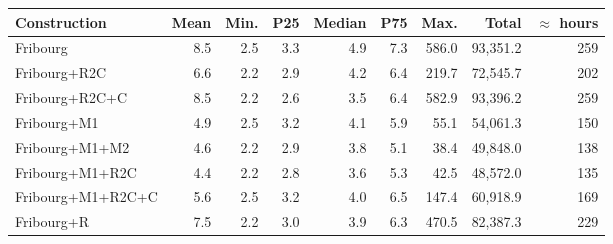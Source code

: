 \begin{tabular}{lrrrrrrrr}
  \hline
Construction & Mean & Min. & P25 & Median & P75 & Max. & Total & $\approx$ hours \\ 
  \hline
Fribourg & 8.5 & 2.5 & 3.3 & 4.9 & 7.3 & 586.0 & 93,351.2 & 259 \\ 
  Fribourg+R2C & 6.6 & 2.2 & 2.9 & 4.2 & 6.4 & 219.7 & 72,545.7 & 202 \\ 
  Fribourg+R2C+C & 8.5 & 2.2 & 2.6 & 3.5 & 6.4 & 582.9 & 93,396.2 & 259 \\ 
  Fribourg+M1 & 4.9 & 2.5 & 3.2 & 4.1 & 5.9 & 55.1 & 54,061.3 & 150 \\ 
  Fribourg+M1+M2 & 4.6 & 2.2 & 2.9 & 3.8 & 5.1 & 38.4 & 49,848.0 & 138 \\ 
  Fribourg+M1+R2C & 4.4 & 2.2 & 2.8 & 3.6 & 5.3 & 42.5 & 48,572.0 & 135 \\ 
  Fribourg+M1+R2C+C & 5.6 & 2.5 & 3.2 & 4.0 & 6.5 & 147.4 & 60,918.9 & 169 \\ 
  Fribourg+R & 7.5 & 2.2 & 3.0 & 3.9 & 6.3 & 470.5 & 82,387.3 & 229 \\ 
   \hline
\end{tabular}
